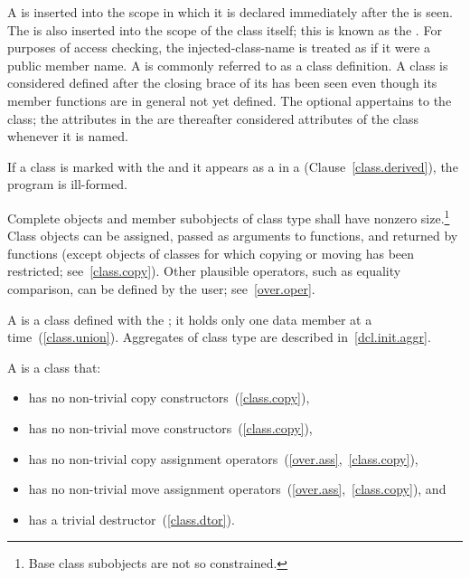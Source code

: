 \pnum
A  is inserted into the scope in which it is
declared immediately after the  is seen. The
 is also inserted into the scope of the class
itself; this is known as the .
%
For purposes of access checking, the injected-class-name is treated as
if it were a public member name.
%
A  is commonly referred to as a class
definition.
%
A class is considered defined after the closing brace of its
 has been seen even though its member
functions are in general not yet defined.
The optional  appertains to the class; the attributes in
the  are thereafter considered attributes of the class
whenever it is named.

\pnum
If a class is marked with the   and it appears
as a  in a 
(Clause~\ref{class.derived}), the program is ill-formed.

\pnum
Complete objects and member subobjects of class type shall have nonzero
size.\footnote{Base class subobjects are not so constrained.}
\enternote
Class objects can be assigned, passed as arguments to functions, and
returned by functions (except objects of classes for which copying or moving has
been restricted; see~\ref{class.copy}). Other plausible operators, such
as equality comparison, can be defined by the user; see~\ref{over.oper}.
\exitnote

\pnum
{}%
%
%
A  is a class defined with the 
;
%
it holds only one data member at a time~(\ref{class.union}).
\enternote
Aggregates of class type are described in~\ref{dcl.init.aggr}.
\exitnote

%
%
\pnum
A  is a class that:

\begin{itemize}
\item has no non-trivial copy constructors~(\ref{class.copy}),
\item has no non-trivial move constructors~(\ref{class.copy}),
\item has no non-trivial copy assignment operators~(\ref{over.ass},~\ref{class.copy}),
\item has no non-trivial move assignment operators~(\ref{over.ass},~\ref{class.copy}), and
\item has a trivial destructor~(\ref{class.dtor}).
\end{itemize}

